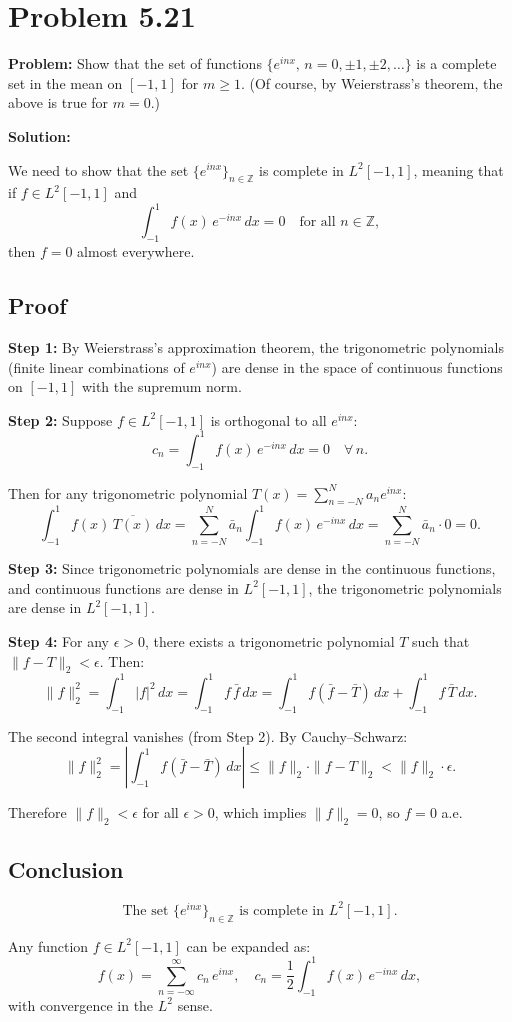 \documentclass[12pt]{article}
\begin{document}
\section*{Problem 5.21}

\textbf{Problem:} Show that the set of functions $\{e^{inx},\, n = 0, \pm 1, \pm 2, \ldots\}$ is a complete set in the mean on $[-1, 1]$ for $m \geq 1$. (Of course, by Weierstrass's theorem, the above is true for $m = 0$.)

\bigskip
\textbf{Solution:}

We need to show that the set $\{e^{inx}\}_{n\in\mathbb{Z}}$ is complete in $L^2[-1,1]$, meaning that if $f \in L^2[-1,1]$ and
\[
\int_{-1}^{1} f(x)\,e^{-inx}\,dx = 0 \quad \text{for all } n \in \mathbb{Z},
\]
then $f = 0$ almost everywhere.

\subsection*{Proof}

\textbf{Step 1:} By Weierstrass's approximation theorem, the trigonometric polynomials (finite linear combinations of $e^{inx}$) are dense in the space of continuous functions on $[-1,1]$ with the supremum norm.

\textbf{Step 2:} Suppose $f \in L^2[-1,1]$ is orthogonal to all $e^{inx}$:
\[
c_n = \int_{-1}^{1} f(x)\,e^{-inx}\,dx = 0 \quad \forall\, n.
\]

Then for any trigonometric polynomial $T(x) = \sum_{n=-N}^{N} a_n e^{inx}$:
\[
\int_{-1}^{1}f(x)\,\overline{T(x)}\,dx = \sum_{n=-N}^{N}\bar{a}_n\int_{-1}^{1}f(x)\,e^{-inx}\,dx = \sum_{n=-N}^{N}\bar{a}_n\cdot 0 = 0.
\]

\textbf{Step 3:} Since trigonometric polynomials are dense in the continuous functions, and continuous functions are dense in $L^2[-1,1]$, the trigonometric polynomials are dense in $L^2[-1,1]$.

\textbf{Step 4:} For any $\epsilon > 0$, there exists a trigonometric polynomial $T$ such that $\|f - T\|_2 < \epsilon$. Then:
\[
\|f\|_2^2 = \int_{-1}^{1}|f|^2\,dx = \int_{-1}^{1}f\,\bar{f}\,dx = \int_{-1}^{1}f(\bar{f}-\bar{T})\,dx + \int_{-1}^{1}f\,\bar{T}\,dx.
\]

The second integral vanishes (from Step 2). By Cauchy--Schwarz:
\[
\|f\|_2^2 = \left|\int_{-1}^{1}f(\bar{f}-\bar{T})\,dx\right| \leq \|f\|_2\cdot\|f - T\|_2 < \|f\|_2\cdot\epsilon.
\]

Therefore $\|f\|_2 < \epsilon$ for all $\epsilon > 0$, which implies $\|f\|_2 = 0$, so $f = 0$ a.e.

\subsection*{Conclusion}

\[
\boxed{\text{The set } \{e^{inx}\}_{n\in\mathbb{Z}} \text{ is complete in } L^2[-1,1].}
\]

Any function $f \in L^2[-1,1]$ can be expanded as:
\[
f(x) = \sum_{n=-\infty}^{\infty}c_n\,e^{inx}, \quad c_n = \frac{1}{2}\int_{-1}^{1}f(x)\,e^{-inx}\,dx,
\]
with convergence in the $L^2$ sense.
\end{document}

